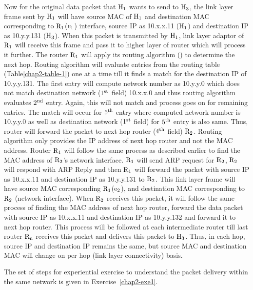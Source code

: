 \begin{multicols}{2}
Now for the original data packet that ${\rm H}_{1}$ wants to send to ${\rm H}_{3}$, the link layer frame sent by ${\rm H}_{1}$ will have source MAC of ${\rm H}_{1}$ and destination MAC corresponding to ${\rm R}_{1}$(${\rm e}_{1}$) interface, source IP as 10.x.x.11 (${\rm H}_{1}$) and destination IP as 10.y.y.131 (${\rm H}_{3}$). When this packet is transmitted by ${\rm H}_{1}$, link layer adaptor of ${\rm R}_{1}$ will receive this frame and pass it to higher layer of router which will process it further. The router ${\rm R}_{1}$ will apply its routing algorithm () to determine the next hop. Routing algorithm will evaluate entries from the routing table (Table\ref{chap2-table-1}) one at a time till it finds a match for the destination IP of 10.y.y.131. The first entry will compute network number as   10.y.y.0 which does not match destination network ($1^{\rm st}$ field) 10.x.x.0 and thus routing algorithm evaluates $2^{\rm nd}$ entry. Again, this will not match and process goes on for remaining entries. The match will occur for $5^{\rm th}$ entry where computed network number is 10.y.y.0 as well as destination network ($1^{\rm st}$ field) for $5^{\rm th}$ entry is also same. Thus, router will forward the packet to next hop router ($4^{\rm th}$ field) ${\rm R}_{2}$. Routing algorithm only provides the IP address of next hop router and not the MAC address. Router ${\rm R}_{1}$ will follow the same process as described earlier to find the MAC address of ${\rm R}_{2}$’s network interface. ${\rm R}_{1}$ will send ARP request for ${\rm R}_{2}$, ${\rm R}_{2}$ will respond with ARP Reply and then ${\rm R}_{1}$ will forward the packet with source IP as 10.x.x.11 and destination IP as 10.y.y.131 to ${\rm R}_{2}$. This link layer frame will have source MAC corresponding ${\rm R}_{1}$(${\rm e}_{2}$), and destination MAC corresponding to ${\rm R}_{2}$ (network interface). When ${\rm R}_{2}$ receives this packet, it will follow the same process of finding the MAC address of next hop router, forward the data packet with source IP as 10.x.x.11 and destination IP as 10.y.y.132 and forward it to next hop router. This process will be followed at each intermediate router till last router ${\rm R}_{\rm n}$ receives this packet and delivers this packet to ${\rm H}_{3}$. Thus, in each hop, source IP and destination IP remains the same, but source MAC and destination MAC will change on per hop (link layer connectivity) basis.

The set of steps for experiential exercise to understand the packet delivery within the same network is given in Exercise~\ref{chap2-exe1}.


\end{multicols}
